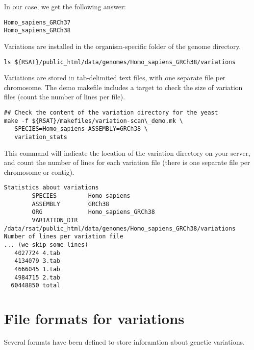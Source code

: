 In our case, we get the following answer:

{\color{OliveGreen} \begin{footnotesize} 
\begin{verbatim}
Homo_sapiens_GRCh37
Homo_sapiens_GRCh38
\end{verbatim} \end{footnotesize}
}

Variations are installed in the organism-specific folder of the genome
directory.

\begin{lstlisting}
ls ${RSAT}/public_html/data/genomes/Homo_sapiens_GRCh38/variations
\end{lstlisting}

Variations are stored in tab-delimited text files, with one separate file
per chromosome.  The demo makefile includes a target to check the size
of variation files (count the number of lines per file).

\begin{lstlisting}
## Check the content of the variation directory for the yeast
make -f ${RSAT}/makefiles/variation-scan\_demo.mk \
   SPECIES=Homo_sapiens ASSEMBLY=GRCh38 \
   variation_stats
\end{lstlisting}

This command will indicate the location of the variation directory on
your \RSAT server, and count the number of lines for each variation
file (there is one separate file per chromosome or contig).


{\color{OliveGreen} \begin{footnotesize} 
\begin{verbatim}
Statistics about variations
        SPECIES         Homo_sapiens
        ASSEMBLY        GRCh38
        ORG             Homo_sapiens_GRCh38
        VARIATION_DIR   /data/rsat/public_html/data/genomes/Homo_sapiens_GRCh38/variations
Number of lines per variation file
... (we skip some lines)
   4027724 4.tab
   4134079 3.tab
   4666045 1.tab
   4984715 2.tab
  60448850 total
\end{verbatim} \end{footnotesize}
}

\section{File formats for variations}

Several formats have been defined to store inforamtion about genetic
variations. 


